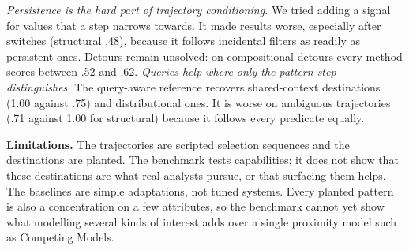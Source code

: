 \documentclass[sigconf]{acmart}
\begin{document}
\emph{Persistence is the hard part of trajectory conditioning.} We tried adding a signal for values that a step narrows towards. It made results worse, especially after switches (structural .48), because it follows incidental filters as readily as persistent ones. Detours remain unsolved: on compositional detours every method scores between .52 and .62.
\emph{Queries help where only the pattern step distinguishes.} The query-aware reference recovers shared-context destinations (1.00 against .75) and distributional ones. It is worse on ambiguous trajectories (.71 against 1.00 for structural) because it follows every predicate equally.

\textbf{Limitations.}
The trajectories are scripted selection sequences and the destinations are planted. The benchmark tests capabilities; it does not show that these destinations are what real analysts pursue, or that surfacing them helps. The baselines are simple adaptations, not tuned systems. Every planted pattern is also a concentration on a few attributes, so the benchmark cannot yet show what modelling several kinds of interest adds over a single proximity model such as Competing Models.




\end{document}
